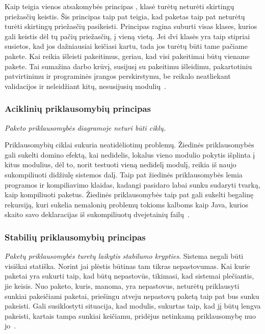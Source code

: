 Kaip teigia vienos atsakomybės principas , klasė turėtų neturėti skirtingų priežasčių keistis.
Šis principas taip pat teigia, kad paketas taip pat neturėtų turėti skirtingų priežasčių pasikeisti.
Principas ragina suburti visas klases, kurios gali keistis dėl tų pačių priežasčių, į vieną vietą.
Jei dvi klasės yra taip stipriai susietos, kad jos dažniausiai keičiasi kartu, tada
jos turėtų būti tame pačiame pakete.
Kai reikia išleisti pakeitimus, geriau, kad visi pakeitimai būtų viename pakete.
Tai sumažina darbo krūvį, susijusį su pakeitimu išleidimu, pakartotiniu patvirtinimu ir programinės įrangos perskirstymu,
be reikalo neatliekant validacijos ir neleidžiant kitų, nesusijusių modulių~\cite{AgileSoftwareDevelopment}.

\subsubsection{Aciklinių priklausomybių principas}
\textit{Paketo priklausomybės diagramoje neturi būti ciklų.}

Priklausomybių ciklai sukuria neatidėliotinų problemų.
Žiedinės priklausomybės gali sukelti domino efektą, kai nedidelis, lokalus vieno modulio pokytis išplinta į kitus modulius,
dėl to, norit testuoti vieną nedidelį modulį, reikia iš naujo sukompiliuoti didžiulę sistemos dalį.
Taip pat žiedinės priklausomybės lemia programos ir kompiliavimo klaidas, kadangi pasidaro labai sunku sudaryti tvarką, kaip kompiliuoti paketus.
Žiedinės priklausomybės taip pat gali sukelti begalinę rekursiją,
kuri sukelia nemalonių problemų tokioms kalboms kaip Java, kurios skaito savo deklaracijas iš
sukompiliuotų dvejetainių failų~\cite{AgileSoftwareDevelopment}.


\subsubsection{Stabilių priklausomybių principas}
\textit{Paketų priklausomybės turetų laikytis stabilumo krypties}.
Sistema negali būti visiškai statiška.
Norint jai plėstis būtinas tam tikras nepastovumas.
Kai kurie paketai yra sukurti taip, kad būtų nepastovūs, tikimasi, kad sistemai plečiantis, jie keisis.
Nuo paketo, kuris, manoma, yra nepastovus, neturėtų priklausyti sunkiai pakeičiami paketai,
 priešingu atveju nepastovų paketą taip pat bus sunku pakeisti.
Gali susiklostyti situacija, kad modulis, sukurtas taip, kad jį būtų lengva pakeisti, kartais tampa sunkiai keičiamu,
pridėjus netinkamą priklausomybę nuo jo~\cite{AgileSoftwareDevelopment}.



